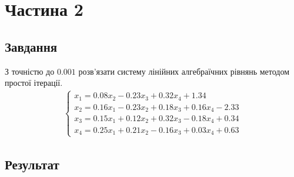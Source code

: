 \section{Частина 2}
\label{sec:task2}

\subsection{Завдання}
\label{subsec:task2_task}

З точністю до $0.001$ розв'язати систему лінійних
алгебраїчних рівнянь методом простої ітерації.
\begin{align*}
    \begin{cases}
        x_1 = 0.08 x_2 - 0.23 x_3 + 0.32 x_4 + 1.34            \\
        x_2 = 0.16 x_1 - 0.23 x_2 + 0.18 x_3 + 0.16 x_4 - 2.33 \\
        x_3 = 0.15 x_1 + 0.12 x_2 + 0.32 x_3 - 0.18 x_4 + 0.34 \\
        x_4 = 0.25 x_1 + 0.21 x_2 - 0.16 x_3 + 0.03 x_4 + 0.63
    \end{cases}
\end{align*}

\subsection{Результат}
\label{subsec:task2_result}

